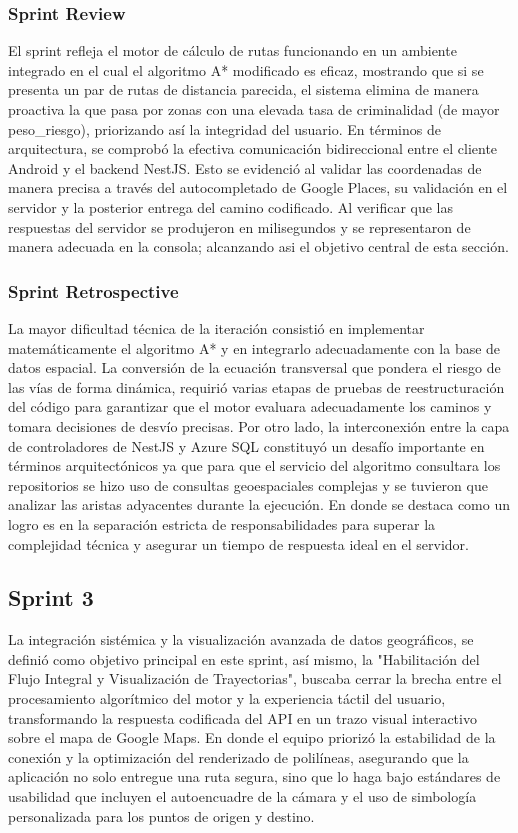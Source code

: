 \subsubsection{Sprint Review}

El sprint refleja el motor de cálculo de rutas funcionando en un ambiente integrado en el cual el algoritmo A* modificado es eficaz, mostrando que si se presenta un par de rutas de distancia parecida, el sistema elimina de manera proactiva la que pasa por zonas con una elevada tasa de criminalidad (de mayor peso\_riesgo), priorizando así la integridad del usuario. En términos de arquitectura, se comprobó la efectiva comunicación bidireccional entre el cliente Android y el backend NestJS. Esto se evidenció al validar las coordenadas de manera precisa a través del autocompletado de Google Places, su validación en el servidor y la posterior entrega del camino codificado. Al verificar que las respuestas del servidor se produjeron en milisegundos y se representaron de manera adecuada en la consola; alcanzando asi el objetivo central de esta sección.

\subsubsection{Sprint Retrospective}

La mayor dificultad técnica de la iteración consistió en implementar matemáticamente el algoritmo A* y en integrarlo adecuadamente con la base de datos espacial. La conversión de la ecuación transversal que pondera el riesgo de las vías de forma dinámica, requirió varias etapas de pruebas de reestructuración del código para garantizar que el motor evaluara adecuadamente los caminos y tomara decisiones de desvío precisas. Por otro lado, la interconexión entre la capa de controladores de NestJS y Azure SQL constituyó un desafío importante en términos arquitectónicos ya que para que el servicio del algoritmo consultara los repositorios se hizo uso de consultas geoespaciales complejas y se tuvieron que analizar las aristas adyacentes durante la ejecución. En donde se destaca como un logro es en la separación estricta de responsabilidades para superar la complejidad técnica y asegurar un tiempo de respuesta ideal en el servidor.

\subsection{Sprint 3}
La integración sistémica y la visualización avanzada de datos geográficos, se definió como objetivo principal en este sprint, así mismo, la "Habilitación del Flujo Integral y Visualización de Trayectorias", buscaba cerrar la brecha entre el procesamiento algorítmico del motor y la experiencia táctil del usuario, transformando la respuesta codificada del API en un trazo visual interactivo sobre el mapa de Google Maps.
En donde el equipo priorizó la estabilidad de la conexión y la optimización del renderizado de polilíneas, asegurando que la aplicación no solo entregue una ruta segura, sino que lo haga bajo estándares de usabilidad que incluyen el autoencuadre de la cámara y el uso de simbología personalizada para los puntos de origen y destino.
